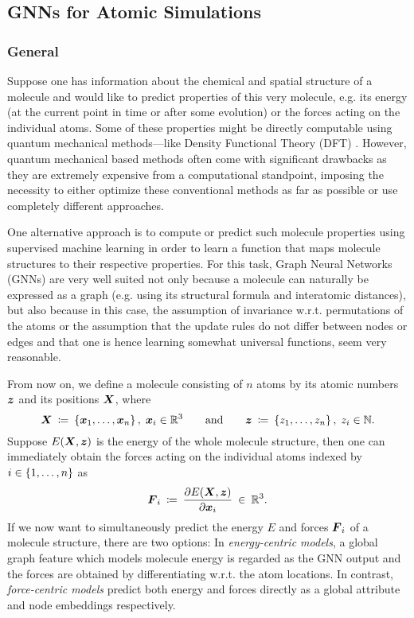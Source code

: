 \subsection{GNNs for Atomic Simulations}
\label{subsec:atomic-simulations}

\subsubsection{General}
\label{subsubsec:atomic-simulations-general}

Suppose one has information about the chemical and spatial structure of a molecule 
and would like to predict properties of this very molecule, e.g. its energy (at the 
current point in time or after some evolution) or the forces acting on the 
individual atoms. Some of these properties might be directly
computable using quantum mechanical methods---like Density Functional Theory (DFT) 
\cite{doi:10.1021/ed5004788}. However, quantum mechanical based methods often come
with significant drawbacks as they are extremely expensive from a computational 
standpoint, imposing the necessity to either optimize these conventional methods 
as far as possible or use completely different approaches.

One alternative approach is to compute or 
predict such molecule properties using supervised
machine learning in order to learn a function that maps molecule structures to their
respective properties. For this task, Graph
Neural Networks (GNNs) are very well suited not only because a molecule can naturally
be expressed as a graph (e.g. using its structural formula and
interatomic distances), but also because in this case, the 
assumption of invariance w.r.t. permutations of the atoms or the assumption that 
the update rules do not differ between nodes or edges and that one is hence
learning somewhat universal functions, seem very reasonable.

From now on, we define a molecule consisting of $n$ atoms by its atomic numbers 
$\boldsymbol{z}$ and its positions $\boldsymbol{X}$, where
\begin{equation}
    \boldsymbol{X} \: \coloneqq \: \left\{\boldsymbol{x}_1, \dots, \boldsymbol{x}_n\right\}, \; \boldsymbol{x}_i \in \mathbb{R}^3
    \qquad \text{and} \qquad 
    \boldsymbol{z} \: \coloneqq \: \left\{z_1, \dots, z_n\right\}, \; z_i \in \mathbb{N} \text{.}
    \label{eq:molecule_setup}
\end{equation}
Suppose $E(\boldsymbol{X}, \boldsymbol{z})$ is the energy of the whole molecule structure, then one can immediately
obtain the forces acting on the individual atoms indexed by $i \in \left\{1, \dots, n\right\}$ as
\[
    \boldsymbol{F}_i \: \coloneqq \: \frac{\partial E(\boldsymbol{X}, \boldsymbol{z})}{\partial \boldsymbol{x}_i} \: \in \: \mathbb{R}^3 \text{.}
\]
If we now want to simultaneously predict the energy $E$ and forces $\boldsymbol{F}_i$
of a molecule structure, there are two options: In \textit{energy-centric models}, 
a global graph feature which models molecule energy
is regarded as the GNN output and the forces are obtained by differentiating w.r.t.
the atom locations. In contrast, \textit{force-centric models} predict both energy and forces
directly as a global attribute and node embeddings respectively.

